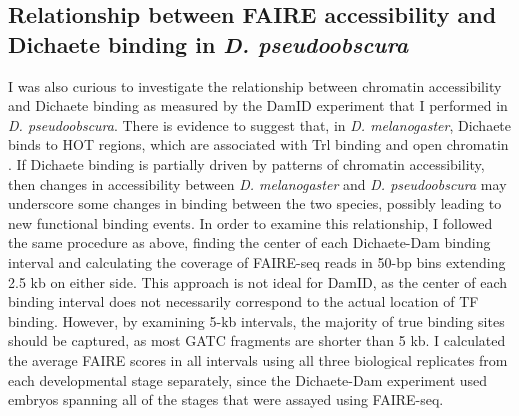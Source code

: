 \subsection{Relationship between FAIRE accessibility and Dichaete binding in \emph{D. pseudoobscura}}
I was also curious to investigate the relationship between chromatin accessibility and Dichaete binding as measured by the DamID experiment that I performed in \emph{D. pseudoobscura}. There is evidence to suggest that, in \emph{D. melanogaster}, Dichaete binds to HOT regions, which are associated with Trl binding and open chromatin \citep{aleksic_role_2013,kvon_hot_2012}. If Dichaete binding is partially driven by patterns of chromatin accessibility, then changes in accessibility between \emph{D. melanogaster} and \emph{D. pseudoobscura} may underscore some changes in binding between the two species, possibly leading to new functional binding events. In order to examine this relationship, I followed the same procedure as above, finding the center of each Dichaete-Dam binding interval and calculating the coverage of FAIRE-seq reads in 50-bp bins extending 2.5 kb on either side. This approach is not ideal for DamID, as the center of each binding interval does not necessarily correspond to the actual location of TF binding. However, by examining 5-kb intervals, the majority of true binding sites should be captured, as most GATC fragments are shorter than 5 kb. I calculated the average FAIRE scores in all intervals using all three biological replicates from each developmental stage separately, since the Dichaete-Dam experiment used embryos spanning all of the stages that were assayed using FAIRE-seq.\\

